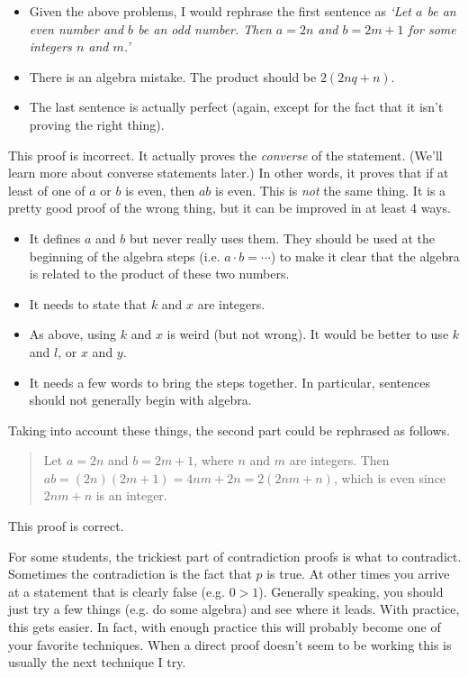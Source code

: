 \begin{eval}
\begin{answer}
\begin{pfevalenum}
\begin{itemize}
Although it is not incorrect, using $n$ and $q$ is just weird.
It is customary to use adjacent letters, like $n$ and $m$, or $q$ and $r$.
\item
Given the above problems, I would rephrase the first sentence as
{\em `Let $a$ be an even number and $b$ be an odd number.
Then $a=2n$ and $b=2m+1$ for some integers $n$ and $m$.'}
\item
There is an algebra mistake.  The product should be $2(2nq+n)$.
\item
The last sentence is actually perfect (again, except for the fact that it isn't proving the right thing).
\end{itemize}
\item
This proof is incorrect.  It actually proves the {\em converse} of the statement.  (We'll learn more about
converse statements later.)
In other words, it proves that if at least of one of $a$ or $b$ is even, then $ab$ is even.  
This is {\em not} the same thing.
It is a pretty good proof
of the wrong thing, but it can be improved in at least 4 ways.
\begin{itemize}
\item
It defines $a$ and $b$ but never really uses them.
They should be used at the beginning of the algebra steps (i.e. $a\cdot b=\cdots$) to make
it clear that the algebra is related to the product of these two numbers.
\item
It needs to state that $k$ and $x$ are integers.
\item
As above, using $k$ and $x$ is weird (but not wrong).  It would be better to use $k$ and $l$, or $x$ and $y$.
\item
It needs a few words to bring the steps together.  
In particular, sentences should not generally begin with algebra.
\end{itemize}
Taking into account these things, the second part could be rephrased as follows.
\begin{quote}
Let $a=2n$ and $b=2m+1$, where $n$ and $m$ are integers.
Then $ab=(2n)(2m+1)=4nm+2n=2(2nm+n)$, which is even since $2nm+n$ is an integer.
\end{quote}
\item
This proof is correct.
\end{pfevalenum}
\end{answer}
\end{eval}

For some students, the trickiest part of contradiction proofs is what to contradict.  
Sometimes the contradiction is the fact that $p$ is true.  
At other times you arrive at a statement that is clearly false (e.g. $0>1$).
Generally speaking, you should just try a few things (e.g. do some algebra) and see where it leads.
With practice, this gets easier. 
In fact, with enough practice this will probably become one of your favorite techniques.
When a direct proof doesn't seem to be working this is usually the next technique I try.


